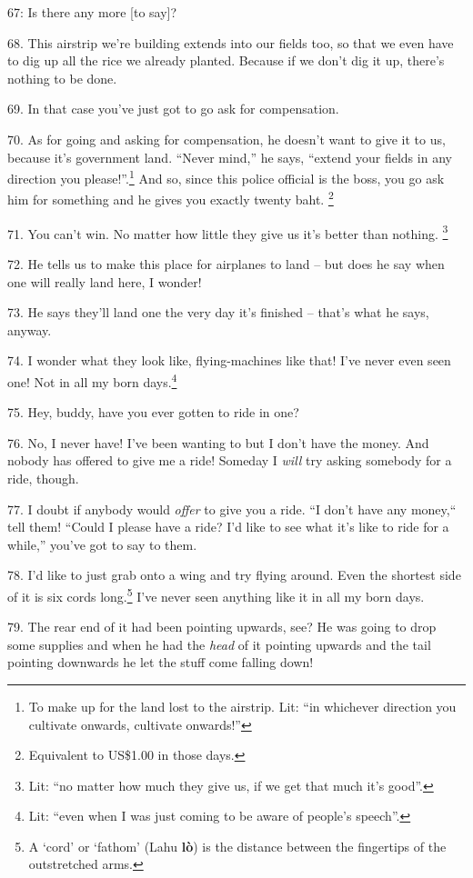  67: Is there any more [to say]?

68. This airstrip we're building extends into our fields too, so that we even have
to dig up all the rice we already planted. Because if we don't dig it up, there's
nothing to be done.

69. In that case you've just got to go ask for compensation.

70. As for going and asking for compensation, he doesn't want to give it to us,
because it's government land. ``Never mind,'' he says, ``extend
your fields in any direction you please!''.\footnote{To make up for the land lost to the airstrip. Lit: ``in whichever direction you cultivate onwards, cultivate onwards!''} And so, since this police official
is the boss, you go ask him for something and he gives you exactly twenty baht.
\footnote{Equivalent to US\$1.00 in those days.}

71. You can't win. No matter how little they give us it's better than nothing.
\footnote{Lit: ``no matter how much they give us, if we get that much it's good''.}

72. He tells us to make this place for airplanes to land -- but does he say when
one will really land here, I wonder!

73. He says they'll land one the very day it's finished -- that's what he says,
anyway.

74. I wonder what they look like, flying-machines like that! I've never even seen
one! Not in all my born days.\footnote{Lit: ``even when I was just coming to be aware of people's speech''.}

75. Hey, buddy, have you ever gotten to ride in one?

76. No, I never have! I've been wanting to but I don't have the money. And nobody
has offered to give me a ride! Someday I \textit{will} try asking somebody for
a ride, though.

77. I doubt if anybody would \textit{offer} to give you a ride. ``I don't
have any money,`` tell them! ``Could I please have a ride? I'd
like to see what it's like to ride for a while,'' you've got to say to
them.

78. I'd like to just grab onto a wing and try flying around. Even the shortest
side of it is six cords long.\footnote{A `cord' or `fathom' (Lahu \textbf{lò}) is the distance between the fingertips of the outstretched arms.} I've never seen anything like it in all my born
days.

79. The rear end of it had been pointing upwards, see? He was going to drop some
supplies and when he had the \textit{head} of it pointing upwards and the tail
pointing downwards he let the stuff come falling down!

